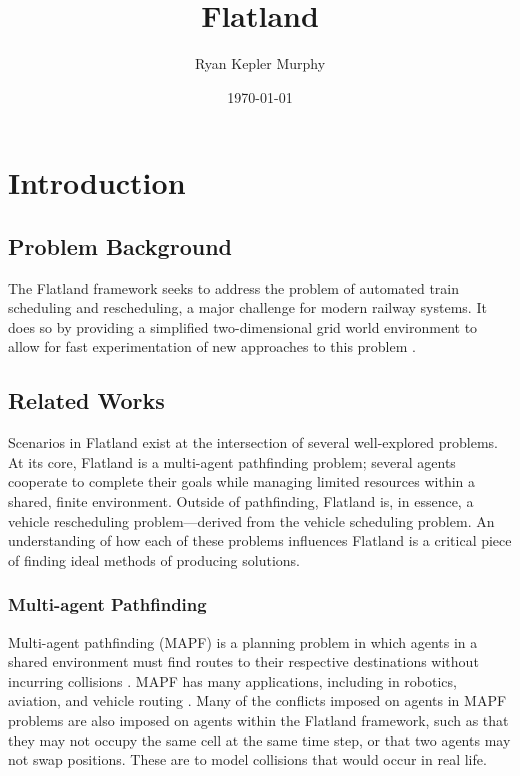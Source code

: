 \documentclass[11pt]{article}
\title{Flatland}
\author{Ryan Kepler Murphy}
\date{\today}
\begin{document}
\maketitle	
\pagebreak

\tableofcontents
\pagebreak


\section{Introduction}
\subsection{Problem Background}
The Flatland framework seeks to address the problem of automated train scheduling and rescheduling, a major challenge
for modern railway systems. It does so by providing a simplified two-dimensional grid world environment to allow for fast experimentation of new approaches to this problem \cite{monylascscbhwaegeibavistsasp20a}. 

\subsection{Related Works}
Scenarios in Flatland exist at the intersection of several well-explored problems.  At its core, Flatland is a multi-agent pathfinding problem; several agents cooperate to complete their goals while managing limited resources within a shared, finite environment.  Outside of pathfinding, Flatland is, in essence, a vehicle rescheduling problem—derived from the vehicle scheduling problem.  An understanding of how each of these problems influences Flatland is a critical piece of finding ideal methods of producing solutions.

\subsubsection{Multi-agent Pathfinding}
Multi-agent pathfinding (MAPF) is a planning problem in which agents in a shared environment must find routes to their respective destinations without incurring collisions \cite{silver05a}.  MAPF has many applications, including in robotics, aviation, and vehicle routing \cite{standley10a}.  Many of the conflicts imposed on agents in MAPF problems are also imposed on agents within the Flatland framework, such as that they may not occupy the same cell at the same time step, or that two agents may not swap positions.  These are to model collisions that would occur in real life.  
\end{document}
